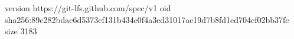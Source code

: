 version https://git-lfs.github.com/spec/v1
oid sha256:89c282bdac6d5373cf131b434e0f4a3ed31017ae19d7b8fd1ed704cf02bb37fc
size 3183

